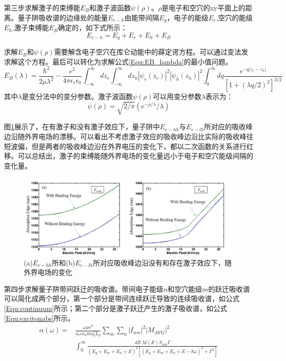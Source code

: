 第三步求解激子的束缚能$E_B$和激子波函数$\psi(\rho)$。$\rho$是电子和空穴的xy平面上的距离。量子阱吸收谱的边缘处的能量$E_{e-h}$由能带间隔$E_g$，电子的能级$E_e$,空穴的能级$E_h$,激子束缚能$E_B$确定的，如下式所示：
\begin{equation}
\label{Equ:Eeh}
E_{e-h} = E_g + E_e + E_h + E_B
\end{equation}

求解$E_B$和$\psi(\rho)$需要解含电子空穴在库仑动能中的薛定谔方程\cite{mares1993modeling}。可以通过变法发求解这个方程\cite{miller1985electric, mares1993modeling}。最后可以转化为求解公式\ref{Equ:EB_lambda}的最小值问题。
\begin{equation}
\label{Equ:EB_lambda}
E_B(\lambda)=\frac{\hbar^2}{2\mu\lambda^2}-\frac{e^2}{4\pi\epsilon_r\epsilon_0}\int_{ - \infty }^{ \infty } {dz_e}\int_{ - \infty }^{ \infty } {dz_h	\left| \psi_e(z_e) \right|^2\left| \psi_h(z_h) \right|^2}\int_{ 0 }^{ \infty }{dq\frac{e^{-q\left| z_e-z_h \right|}}{\left[1+\left( \lambda q/2 \right) ^2 \right]^{3/2}}}
\end{equation}
其中$\lambda$是变分法中的变分参数。激子波函数$\psi(\rho)$可以用变分参数$\lambda$表示为：
\begin{equation}
\label{Equ:psirho}
\psi(\rho)=\sqrt{2/\pi}\left(e^{-\rho/\lambda}/\lambda \right)
\end{equation}

图\ref{fig_ch2_ex_abs}展示了，在有激子和没有激子效应下，量子阱中$E_{e-hh}$与$E_{e-lh}$所对应的吸收峰边沿随外界电场的漂移。可以看出不考虑激子效应的吸收峰边沿比实际的吸收峰往短波偏，但是两者的吸收峰边沿在外界电压的变化下，都以二次函数的关系进行红移。可以总结出，激子的束缚能随外界电场的变化量远小于电子和空穴能级间隔的变化量。
\begin{figure}[htb]
	\centering
	\includegraphics[width=16cm]{./Pictures/fig_ch2_ex_abs.jpg}
	\caption{(a)$E_{e-hh}$所和(b)$E_{e-lh}$所对应吸收峰边沿没有和存在激子效应下，随外界电场的变化}
	\label{fig_ch2_ex_abs}
\end{figure}

第四步求解量子阱带间跃迁的吸收谱。带间电子能级$n$和空穴能级$m$的跃迁吸收谱可以简化成两个部分，第一个部分是带间连续跃迁导致的连续吸收谱，如公式\ref{Equ:continuum}所示；第二个部分是激子跃迁产生的激子吸收谱，如公式\ref{Equ:excitonabs}所示。
\begin{equation}
\label{Equ:continuumabs}
\begin{aligned}
\alpha(\omega) = &\frac{\omega \mu e^2}{n_rc\epsilon_0\pi m_0^2 L_p} \sum_m\sum_n\left| I_{nm} \right|^2\left| M_{AVG} \right|^2 \\ & \int_{0}^{\infty}\frac{dE~M(E)S_{nm}\Gamma}{(E_g+E_m+E_n+E)^2[(E_g+E_m+E_n+E-\hbar\omega)^2+\Gamma^2]}
\end{aligned}
\end{equation}

